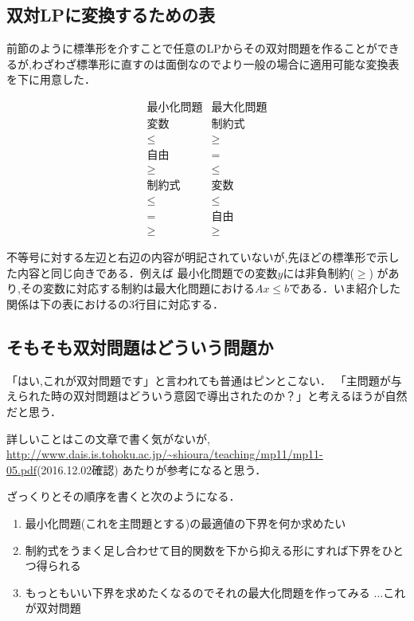 \documentclass[13pt]{jarticle}
\theoremstyle{nonitalic} %
\begin{document}
\subsection{双対LPに変換するための表}

前節のように標準形を介すことで任意のLPからその双対問題を作ることができるが,わざわざ標準形に直すのは面倒なのでより一般の場合に適用可能な変換表を下に用意した．


\begin{equation*}
\begin{array}{c|c}
  \textrm{最小化問題} &  \textrm{最大化問題} \\ \hline \hline
  \textrm{変数} &  \textrm{制約式} \\ \hline
  \leq & \geq \\
  \textrm{自由} & = \\
  \geq & \leq \\ \hline \hline
  \textrm{制約式} & \textrm{変数} \\ \hline
  \leq & \leq \\
   =   & \textrm{自由} \\
  \geq & \geq
\end{array}
\end{equation*}

不等号に対する左辺と右辺の内容が明記されていないが,先ほどの標準形で示した内容と同じ向きである．例えば 最小化問題での変数$y$には非負制約($ \geq$) があり,その変数に対応する制約は最大化問題における$Ax \leq b$である．いま紹介した関係は下の表におけるの3行目に対応する．

\subsection{そもそも双対問題はどういう問題か}
「はい,これが双対問題です」と言われても普通はピンとこない．
「主問題が与えられた時の双対問題はどういう意図で導出されたのか？」と考えるほうが自然だと思う．

詳しいことはこの文章で書く気がないが,
\url{http://www.dais.is.tohoku.ac.jp/~shioura/teaching/mp11/mp11-05.pdf}(2016.12.02確認) あたりが参考になると思う．

ざっくりとその順序を書くと次のようになる．
\begin{enumerate}
\item 最小化問題(これを主問題とする)の最適値の下界を何か求めたい
\item 制約式をうまく足し合わせて目的関数を下から抑える形にすれば下界をひとつ得られる
\item もっともいい下界を求めたくなるのでそれの最大化問題を作ってみる $\dots$これが双対問題
\end{enumerate}
\end{document}
